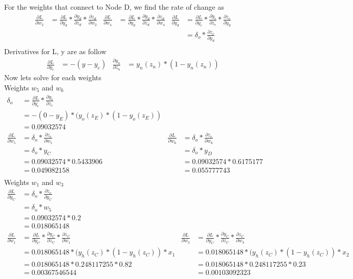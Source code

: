 \documentclass[12pt,english]{article}
\begin{document}
 For the weights that connect to Node D, we find the rate of change as
\begin{align*}
\frac{\partial L}{\partial w_2} &=\frac{\partial L}{\partial y_d} * \frac{\partial y_d}{\partial z_d} * \frac{\partial z_d}{\partial w_2} &
\frac{\partial L}{\partial w_4} &=\frac{\partial L}{\partial y_d} * \frac{\partial y_d}{\partial z_d} * \frac{\partial z_d}{\partial w_4} &
 \frac{\partial L}{\partial y_d}  &= \frac{\partial L}{\partial y_e} * \frac{\partial y_e}{\partial z_e} * \frac{\partial z_e}{\partial y_d} \\
& &&&  &= \delta_o * \frac{\partial z_e}{\partial y_d} \\
\end{align*}
Derivatives for L, y  are as follow
\begin{align*}
\frac{\partial L}{\partial y_e} &= -(y -y_e) &
 \frac{\partial y_n}{\partial z_n}&= y_n(z_n) * (1 - y_n(z_n))
\end{align*}
Now lets solve for each weights\\
Weights $w_5$ and $w_6$
\begin{align*}
\delta_o &= \frac{\partial L}{\partial y_e} * \frac{\partial y_e}{\partial z_e}\\
 &=-(0 - y_E) * (y_o(z_E) *(1 -y_o(z_E))\\
 &=0.09032574\\
\frac{\partial L}{\partial w_5} &=\delta_o* \frac{\partial z_e}{\partial w_5} &
\frac{\partial L}{\partial w_6} &=\delta_o * \frac{\partial z_e}{\partial w_6} \\
&=\delta_o * y_C &
&=\delta_o * y_D \\
&=0.09032574 * 0.5433906 &
&=0.09032574 * 0.6175177 \\
&=0.049082158&
&=0.055777743\\
\end{align*}
Weights $w_1$ and $w_3$
\begin{align*}
 \frac{\partial L}{\partial y_C}  &= \delta_o * \frac{\partial z_e}{\partial y_C}\\
&= \delta_o * w_5\\
&= 0.09032574 * 0.2\\
&=0.018065148\\
\frac{\partial L}{\partial w_1} &=\frac{\partial L}{\partial y_C} * \frac{\partial y_C}{\partial z_C} * \frac{\partial z_C}{\partial w_1} &
\frac{\partial L}{\partial w_3} &=\frac{\partial L}{\partial y_C} * \frac{\partial y_C}{\partial z_C} * \frac{\partial z_C}{\partial w_3} \\
&=0.018065148 * (y_h(z_C) *(1 -y_h(z_C)) * x_1 &
&=0.018065148 * (y_h(z_C) *(1 -y_h(z_C)) * x_2\\
&=0.018065148 * 0.248117255 * 0.82 &
&=0.018065148 * 0.248117255 * 0.23\\
&=0.00367546544 &
&=0.00103092323\\
\end{align*}
\end{document}
